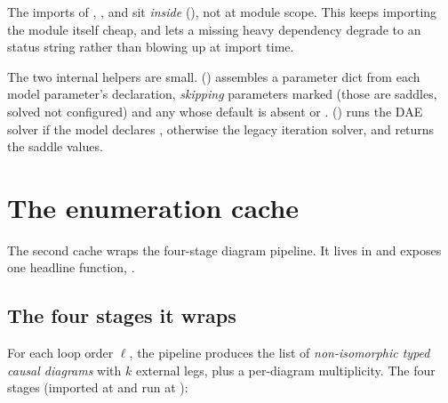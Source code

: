 \begin{note}
The imports of , , and
 sit \emph{inside} 
(), not at module scope. This keeps importing the
module itself cheap, and lets a missing heavy dependency degrade to an
 status string rather than blowing up at import time.
\end{note}

The two internal helpers are small. 
() assembles a parameter dict from each model
parameter's  declaration, \emph{skipping} parameters marked
 (those are saddles, solved not configured) and any whose
default is absent or . 
() runs the DAE solver if the model declares
, otherwise the legacy iteration solver, and returns the saddle
values.

\section{The enumeration cache}
\label{sec:enumcache}

The second cache wraps the four-stage diagram pipeline. It lives in
 and exposes one headline function,
.

\subsection{The four stages it wraps}

For each loop order $\ell$, the pipeline produces the list of
\emph{non-isomorphic typed causal diagrams} with $k$ external legs, plus a
per-diagram multiplicity. The four stages (imported at
 and run at ):

